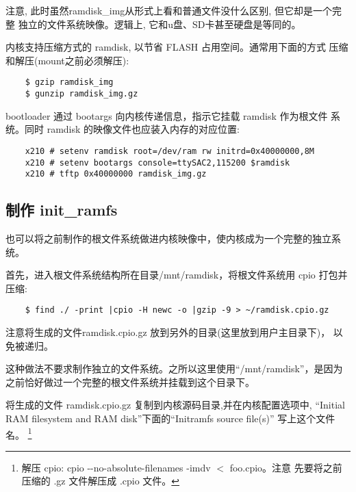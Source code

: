 	注意, 此时虽然ramdisk\_img从形式上看和普通文件没什么区别, 但它却是一个完整
独立的文件系统映像。逻辑上, 它和u盘、SD卡甚至硬盘是等同的。

	内核支持压缩方式的 ramdisk, 以节省 FLASH 占用空间。通常用下面的方式
压缩和解压(mount之前必须解压):

\begin{boxedminipage}{.9\textwidth}
\begin{verbatim}
	$ gzip ramdisk_img
	$ gunzip ramdisk_img.gz
\end{verbatim}
\end{boxedminipage}

	bootloader 通过 bootargs 向内核传递信息，指示它挂载 ramdisk 作为根文件
系统。同时 ramdisk 的映像文件也应装入内存的对应位置:

\begin{boxedminipage}{.9\textwidth}
\begin{verbatim}
	x210 # setenv ramdisk root=/dev/ram rw initrd=0x40000000,8M
	x210 # setenv bootargs console=ttySAC2,115200 $ramdisk
	x210 # tftp 0x40000000 ramdisk_img.gz
\end{verbatim}
\end{boxedminipage}

\subsection{制作 init\_ramfs}
	也可以将之前制作的根文件系统做进内核映像中，使内核成为一个完整的独立系统。

	首先，进入根文件系统结构所在目录/mnt/ramdisk，将根文件系统用 cpio
    打包并压缩:

\begin{boxedminipage}{.9\textwidth}
\begin{verbatim}
	$ find ./ -print |cpio -H newc -o |gzip -9 > ~/ramdisk.cpio.gz
\end{verbatim}
\end{boxedminipage}

    注意将生成的文件ramdisk.cpio.gz 放到另外的目录(这里放到用户主目录下)，
    以免被递归。

	这种做法不要求制作独立的文件系统。之所以这里使用``/mnt/ramdisk''，是因为
之前恰好做过一个完整的根文件系统并挂载到这个目录下。

	将生成的文件 ramdisk.cpio.gz 复制到内核源码目录,并在内核配置选项中,
``Initial RAM filesystem and RAM disk''下面的``Initramfs source file(s)''
写上这个文件名。
\footnote{解压 cpio: cpio -{}-no-absolute-filenames -imdv $<$ foo.cpio。注意
    先要将之前压缩的 .gz 文件解压成 .cpio 文件。}

